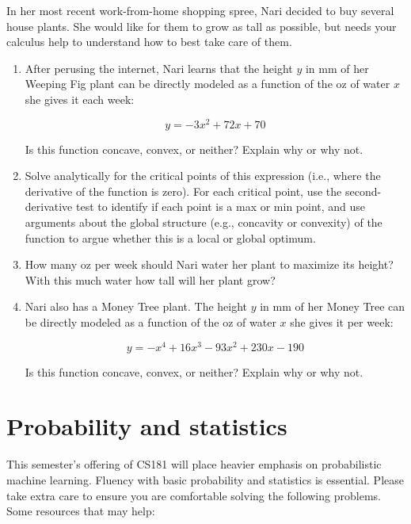 \documentclass{harvardml}
\theoremstyle{definition}
\theoremstyle{plain}
\begin{document}
\begin{problem}
In her most recent work-from-home shopping spree, Nari decided to buy several house plants.  She would like for them to grow as tall as possible, but needs your calculus help to understand how to best take care of them.

\begin{enumerate} [label=(\alph*)] 
\item After perusing the internet, Nari learns that the height $y$ in mm of her Weeping Fig plant can be directly modeled as a function of the oz of water $x$ she gives it each week:

$$ y = - 3x^2 + 72x + 70$$

Is this function concave, convex, or neither?  Explain why or why not.

\item Solve analytically for the critical points of this expression (i.e., where the derivative of the function is zero).  For each critical point, use the second-derivative test to identify if each point is a  max or min point, and use arguments about the global structure (e.g., concavity or convexity) of the function to argue whether this is a local or global optimum. 

\item How many oz per week should Nari water her plant to maximize its height? With this much water how tall will her plant grow?

\item Nari also has a Money Tree plant.  The height $y$ in mm of her Money Tree can be directly modeled as a function of the oz of water $x$ she gives it per week:

$$ y = - x^4 + 16 x^3 - 93 x^2 + 230 x - 190$$

Is this function concave, convex, or neither?  Explain why or why not.

\end{enumerate}
\end{problem}

\newpage
\section{Probability and statistics}
This semester's offering of CS181 will place heavier emphasis on probabilistic
machine learning. Fluency with basic probability and statistics is essential.
Please take extra care to ensure you are comfortable solving the following
problems. Some resources that may help:
\end{document}
